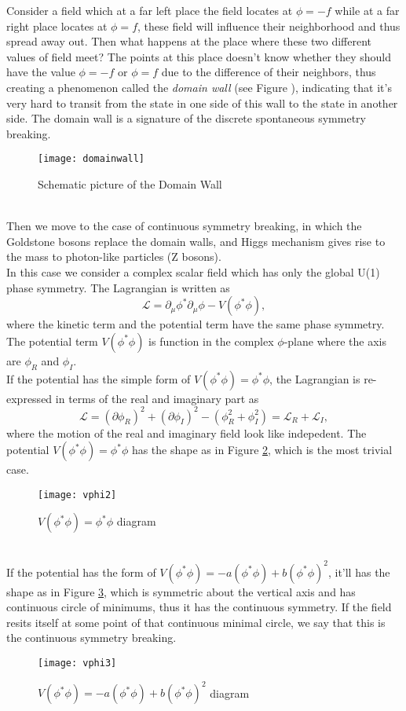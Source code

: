 \documentclass{article}
\newcommand{\be}{\begin{equation}}
\newcommand{\ee}{\end{equation}}
\newcommand{\p}{\partial}
\renewcommand{\1}{\left}
\renewcommand{\2}{\right}
\newcommand{\ma}{\mathcal}
\newcommand{\m}{\mu}
\begin{document}
Consider a field which at a far left place the field locates at $\phi=-f$ while at a far right place locates at $\phi=f$, these field will influence their neighborhood and thus spread away out. Then what happens at the place where these two different values of field meet? The points at this place doesn't know whether they should have the value $\phi=-f$ or $\phi=f$ due to the difference of their neighbors, thus creating a phenomenon called the \textit{domain wall} (see Figure \label{dw}), indicating that it's very hard to transit from the state in one side of this wall to the state in another side. The domain wall is a signature of the discrete spontaneous symmetry breaking.
\begin{figure}[h]
\centering
\texttt{[image: domainwall]}
\caption{\label{dw}Schematic picture of the Domain Wall}
\end{figure}\\

Then we move to the case of continuous symmetry breaking, in which the Goldstone bosons replace the domain walls, and Higgs mechanism gives rise to the mass to photon-like particles (Z bosons).\\
In this case we consider a complex scalar field which has only the global U(1) phase symmetry. The Lagrangian is written as
\be
\ma L=\p_\m \phi^*\p_\m \phi-V(\phi^*\phi),
\ee
where the kinetic term and the potential term have the same phase symmetry. The potential term $V(\phi^*\phi)$ is function in the complex $\phi$-plane where the axis are $\phi_R$ and $\phi_I$.\\

If the potential has the simple form of $V(\phi^*\phi)=\phi^*\phi$, the Lagrangian is re-expressed in terms of the real and imaginary part as
\be \ma L=(\p\phi_R)^2+(\p\phi_I)^2-(\phi_R^2+\phi_I^2)=\ma L_R+\ma L_I, \ee
where the motion of the real and imaginary field look like indepedent.
The potential $V(\phi^*\phi)=\phi^*\phi$ has the shape as in Figure \ref{vphi2}, which is the most trivial case.
\begin{figure}[h]
\centering
\texttt{[image: vphi2]}
\caption{\label{vphi2}$V(\phi^*\phi)=\phi^*\phi$ diagram}
\end{figure}\\

If the potential has the form of $V(\phi^*\phi)=-a(\phi^*\phi)+b(\phi^*\phi)^2$, it'll has the shape as in Figure \ref{vphi3}, which is symmetric about the vertical axis and has continuous circle of minimums, thus it has the continuous symmetry. If the field resits itself at some point of that continuous minimal circle, we say that this is the continuous symmetry breaking.
\begin{figure}[h]
\centering
\texttt{[image: vphi3]}
\caption{\label{vphi3}$V(\phi^*\phi)=-a(\phi^*\phi)+b(\phi^*\phi)^2$ diagram}
\end{figure}\\
\end{document}
